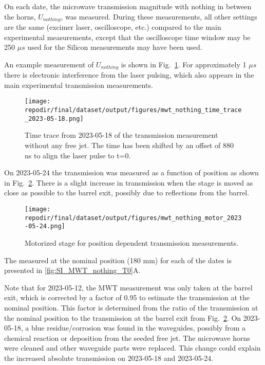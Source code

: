 On each date, the microwave transmission magnitude with nothing in between the horns, $U_{nothing}$, was measured. During these measurements, all other settings are the same (excimer laser, oscilloscope, etc.) compared to the main experimental measurements, except that the oscilloscope time window may be 250 $\mu s$ used for the Silicon measurements may have been used. %

An example measurement of $U_{nothing}$ is shown in Fig.\ \ref{fig:SI_MWT_nothing_time_trace}. For approximately 1 $\mu s$ there is electronic interference from the laser pulsing, which also appears in the main experimental transmission measurements. 



\begin{figure}[]
\centering
\texttt{[image: \\repodir/final/dataset/output/figures/mwt\_nothing\_time\_trace\_2023-05-18.png]}
\caption{Time trace from 2023-05-18 of the transmission measurement without any free jet. The time has been shifted by an offset of 880 ns to align the laser pulse to t=0.}
\label{fig:SI_MWT_nothing_time_trace}
\end{figure}

On 2023-05-24 the transmission was measured as a function of position as shown in Fig.\ \ref{fig:SI_MWT_nothing_motor}. There is a slight increase in transmission when the stage is moved as close as possible to the barrel exit, possibly due to reflections from the barrel.


\begin{figure}
\centering
\texttt{[image: \\repodir/final/dataset/output/figures/mwt\_nothing\_motor\_2023-05-24.png]}
\caption{Motorized stage for position dependent transmission measurements.}
\label{fig:SI_MWT_nothing_motor}
\end{figure}


The  measured at the nominal position (180 mm) for each of the dates is presented in \ref{fig:SI_MWT_nothing_T0}A. %

Note that for 2023-05-12, the MWT measurement was only taken at the barrel exit, which is corrected by a factor of 0.95 to estimate the transmission at the nominal position. This factor is determined from the ratio of the transmission at the nominal position to the transmission at the barrel exit from Fig.\ \ref{fig:SI_MWT_nothing_motor}. On 2023-05-18, a blue residue/corrosion was found in the waveguides, possibly from a chemical reaction or deposition from the seeded free jet. The microwave horns were cleaned and other waveguide parts were replaced. This change could explain the increased absolute transmission on 2023-05-18 and 2023-05-24.

